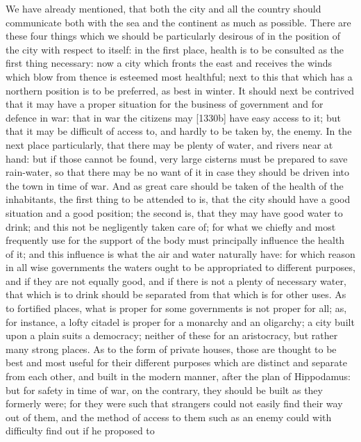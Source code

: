
We have already mentioned, that both the city and all the country should
communicate both with the sea and the continent as much as possible. There
are these four things which we should be particularly desirous of in the
position of the city with respect to itself: in the first place, health is
to be consulted as the first thing necessary: now a city which fronts the
east and receives the winds which blow from thence is esteemed most
healthful; next to this that which has a northern position is to be
preferred, as best in winter. It should next be contrived that it may have
a proper situation for the business of government and for defence in war:
that in war the citizens may [1330b] have easy access to it; but that it
may be difficult of access to, and hardly to be taken by, the enemy. In
the next place particularly, that there may be plenty of water, and rivers
near at hand: but if those cannot be found, very large cisterns must be
prepared to save rain-water, so that there may be no want of it in case
they should be driven into the town in time of war. And as great care
should be taken of the health of the inhabitants, the first thing to be
attended to is, that the city should have a good situation and a good
position; the second is, that they may have good water to drink; and this
not be negligently taken care of; for what we chiefly and most frequently
use for the support of the body must principally influence the health of
it; and this influence is what the air and water naturally have: for which
reason in all wise governments the waters ought to be appropriated to
different purposes, and if they are not equally good, and if there is not
a plenty of necessary water, that which is to drink should be separated
from that which is for other uses. As to fortified places, what is proper
for some governments is not proper for all; as, for instance, a lofty
citadel is proper for a monarchy and an oligarchy; a city built upon a
plain suits a democracy; neither of these for an aristocracy, but rather
many strong places. As to the form of private houses, those are thought to
be best and most useful for their different purposes which are distinct
and separate from each other, and built in the modern manner, after the
plan of Hippodamus: but for safety in time of war, on the contrary, they
should be built as they formerly were; for they were such that strangers
could not easily find their way out of them, and the method of access to
them such as an enemy could with difficulty find out if he proposed to
